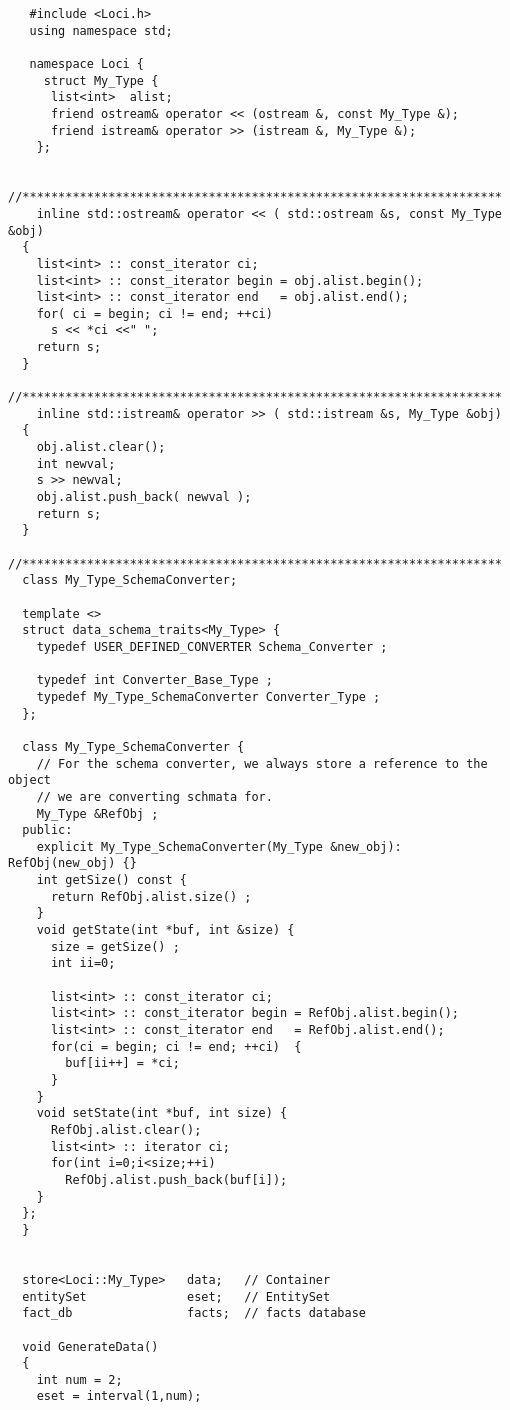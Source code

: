 \begin{verbatim}
   #include <Loci.h>
   using namespace std;
 
   namespace Loci {
     struct My_Type {
      list<int>  alist;
      friend ostream& operator << (ostream &, const My_Type &);
      friend istream& operator >> (istream &, My_Type &);
    };

    //*******************************************************************
    inline std::ostream& operator << ( std::ostream &s, const My_Type &obj)
  {
    list<int> :: const_iterator ci;
    list<int> :: const_iterator begin = obj.alist.begin();
    list<int> :: const_iterator end   = obj.alist.end();
    for( ci = begin; ci != end; ++ci)
      s << *ci <<" ";
    return s;
  }
    //*******************************************************************
    inline std::istream& operator >> ( std::istream &s, My_Type &obj)
  {
    obj.alist.clear();
    int newval;
    s >> newval;
    obj.alist.push_back( newval );
    return s;
  }
  //*******************************************************************
  class My_Type_SchemaConverter;

  template <>
  struct data_schema_traits<My_Type> {
    typedef USER_DEFINED_CONVERTER Schema_Converter ;

    typedef int Converter_Base_Type ;
    typedef My_Type_SchemaConverter Converter_Type ;
  };

  class My_Type_SchemaConverter {
    // For the schema converter, we always store a reference to the object
    // we are converting schmata for.
    My_Type &RefObj ;
  public:
    explicit My_Type_SchemaConverter(My_Type &new_obj): RefObj(new_obj) {}
    int getSize() const {
      return RefObj.alist.size() ;
    }
    void getState(int *buf, int &size) {
      size = getSize() ;
      int ii=0;

      list<int> :: const_iterator ci;
      list<int> :: const_iterator begin = RefObj.alist.begin();
      list<int> :: const_iterator end   = RefObj.alist.end();
      for(ci = begin; ci != end; ++ci)  {
        buf[ii++] = *ci;
      }
    }
    void setState(int *buf, int size) {
      RefObj.alist.clear();
      list<int> :: iterator ci;
      for(int i=0;i<size;++i)
        RefObj.alist.push_back(buf[i]);
    }
  };
  }


  store<Loci::My_Type>   data;   // Container
  entitySet              eset;   // EntitySet
  fact_db                facts;  // facts database

  void GenerateData()
  {
    int num = 2;
    eset = interval(1,num);


\end{verbatim}
